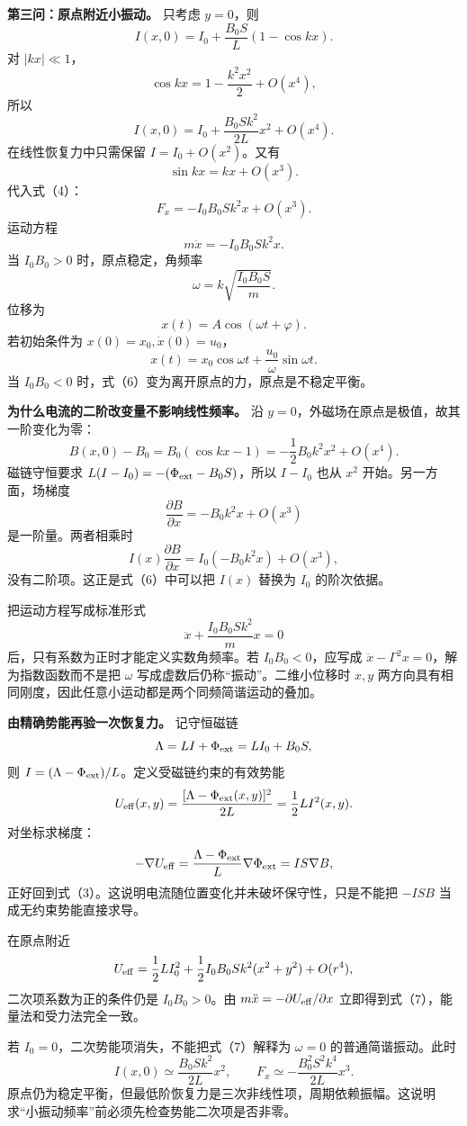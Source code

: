 \documentclass[12pt,a4paper,UTF8]{ctexart}
\begin{document}
\textbf{第三问：原点附近小振动。} 只考虑 \(y=0\)，则 \[
I(x,0)=I_0+\frac{B_0S}{L}(1-\cos kx).
\] 对 \(|kx|\ll1\)， \[
\cos kx=1-\frac{k^2x^2}{2}+O(x^4),
\] 所以 \[
I(x,0)=I_0+\frac{B_0Sk^2}{2L}x^2+O(x^4). \tag{5}
\] 在线性恢复力中只需保留 \(I=I_0+O(x^2)\)。又有 \[
\sin kx=kx+O(x^3).
\] 代入式（4）： \[
F_x=-I_0B_0Sk^2x+O(x^3). \tag{6}
\] 运动方程 \[
m\ddot x=-I_0B_0Sk^2x.
\] 当 \(I_0B_0>0\) 时，原点稳定，角频率 \[
\boxed{
\omega=k\sqrt{\frac{I_0B_0S}{m}}
}. \tag{7}
\] 位移为 \[
\boxed{
x(t)=A\cos(\omega t+\varphi)
}. \tag{8}
\] 若初始条件为 \(x(0)=x_0,\dot x(0)=u_0\)， \[
x(t)=x_0\cos\omega t+\frac{u_0}{\omega}\sin\omega t.
\] 当 \(I_0B_0<0\) 时，式（6）变为离开原点的力，原点是不稳定平衡。

\textbf{为什么电流的二阶改变量不影响线性频率。} 沿
\(y=0\)，外磁场在原点是极值，故其一阶变化为零： \[
B(x,0)-B_0
=B_0(\cos kx-1)
=-\frac12B_0k^2x^2+O(x^4).
\] 磁链守恒要求 \(L(I-I_0)=-(\Phi_{\rm ext}-B_0S)\)，所以 \(I-I_0\) 也从
\(x^2\) 开始。另一方面，场梯度 \[
\frac{\partial B}{\partial x}
=-B_0k^2x+O(x^3)
\] 是一阶量。两者相乘时 \[
I(x)\frac{\partial B}{\partial x}
=I_0(-B_0k^2x)+O(x^3),
\] 没有二阶项。这正是式（6）中可以把 \(I(x)\) 替换为 \(I_0\)
的阶次依据。

把运动方程写成标准形式 \[
\ddot x+\frac{I_0B_0Sk^2}{m}x=0
\] 后，只有系数为正时才能定义实数角频率。若 \(I_0B_0<0\)，应写成
\(\ddot x-\Gamma^2x=0\)，解为指数函数而不是把 \(\omega\)
写成虚数后仍称``振动''。二维小位移时 \(x,y\)
两方向具有相同刚度，因此任意小运动都是两个同频简谐运动的叠加。

\textbf{由精确势能再验一次恢复力。} 记守恒磁链 \[
\Lambda=LI+\Phi_{\rm ext}=LI_0+B_0S,
\] 则 \(I=(\Lambda-\Phi_{\rm ext})/L\)。定义受磁链约束的有效势能 \[
U_{\rm eff}(x,y)
=\frac{[\Lambda-\Phi_{\rm ext}(x,y)]^2}{2L}
=\frac12LI^2(x,y).
\] 对坐标求梯度： \[
-\nabla U_{\rm eff}
=\frac{\Lambda-\Phi_{\rm ext}}L\nabla\Phi_{\rm ext}
=IS\nabla B,
\] 正好回到式（3）。这说明电流随位置变化并未破坏保守性，只是不能把
\(-ISB\) 当成无约束势能直接求导。

在原点附近 \[
U_{\rm eff}
=\frac12LI_0^2+
\frac12I_0B_0Sk^2(x^2+y^2)+O(r^4),
\] 二次项系数为正的条件仍是 \(I_0B_0>0\)。由
\(m\ddot x=-\partial U_{\rm eff}/\partial x\)
立即得到式（7），能量法和受力法完全一致。

若 \(I_0=0\)，二次势能项消失，不能把式（7）解释为 \(\omega=0\)
的普通简谐振动。此时 \[
I(x,0)\simeq\frac{B_0Sk^2}{2L}x^2,
\qquad
F_x\simeq-\frac{B_0^2S^2k^4}{2L}x^3.
\]
原点仍为稳定平衡，但最低阶恢复力是三次非线性项，周期依赖振幅。这说明求``小振动频率''前必须先检查势能二次项是否非零。
\end{document}

